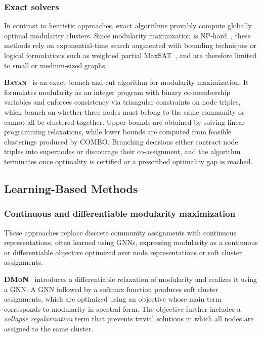 \documentclass[../paper.tex]{subfiles}
\begin{document}
\subsubsection{Exact solvers}

In contrast to heuristic approaches, exact algorithms provably compute globally optimal modularity clusters.
Since modularity maximization is NP-hard~\cite{Brandes2008}, these methods rely on exponential-time search augmented with bounding techniques or logical formulations such as weighted partial MaxSAT~\cite{maxsat2025}, and are therefore limited to small or medium-sized graphs.

\textbf{\textsc{Bayan}}~\cite{bayan2024} is an exact branch-and-cut algorithm for modularity maximization.
It formulates modularity as an integer program with binary co-membership variables and enforces consistency via triangular constraints on node triples, which branch on whether three nodes must belong to the same community or cannot all be clustered together.
Upper bounds are obtained by solving linear programming relaxations, while lower bounds are computed from feasible clusterings produced by \textsc{COMBO}.
Branching decisions either contract node triples into supernodes or discourage their co-assignment, and the algorithm terminates once optimality is certified or a prescribed optimality gap is reached.

\subsection{Learning-Based Methods}

\subsubsection{Continuous and differentiable modularity maximization}\hfill

\noindent These approaches replace discrete community assignments with continuous representations, often learned using GNNs, expressing modularity as a continuous or differentiable objective optimized over node representations or soft cluster assignments.

\textbf{\textsc{DMoN}}~\cite{dmon2023} introduces a differentiable relaxation of modularity and realizes it using a GNN.
A GNN followed by a softmax function produces soft cluster assignments, which are optimized using an objective whose main term corresponds to modularity in spectral form. 
The objective further includes a \emph{collapse regularization} term that prevents trivial solutions in which all nodes are assigned to the same cluster.
\end{document}
